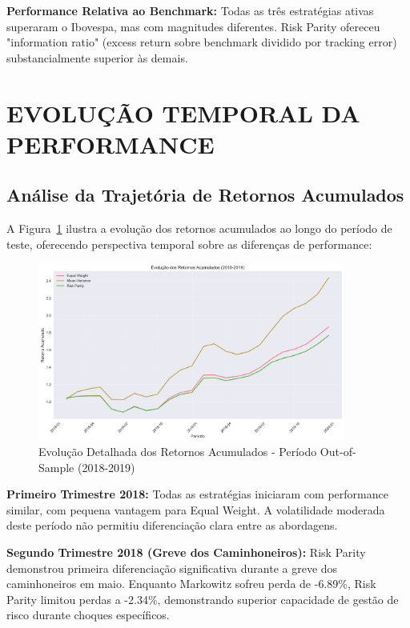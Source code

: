 \textbf{Performance Relativa ao Benchmark:} Todas as três estratégias ativas superaram o Ibovespa, mas com magnitudes diferentes. Risk Parity ofereceu "information ratio" (excess return sobre benchmark dividido por tracking error) substancialmente superior às demais.

\section{EVOLUÇÃO TEMPORAL DA PERFORMANCE}

\subsection{Análise da Trajetória de Retornos Acumulados}

A Figura~\ref{fig:retornos_acumulados_detalhado} ilustra a evolução dos retornos acumulados ao longo do período de teste, oferecendo perspectiva temporal sobre as diferenças de performance:

\begin{figure}[H]
\centering
\includegraphics[width=0.90\textwidth]{figures/retornos_acumulados.png}
\caption{Evolução Detalhada dos Retornos Acumulados - Período Out-of-Sample (2018-2019)}
\label{fig:retornos_acumulados_detalhado}
\end{figure}

\textbf{Primeiro Trimestre 2018:} Todas as estratégias iniciaram com performance similar, com pequena vantagem para Equal Weight. A volatilidade moderada deste período não permitiu diferenciação clara entre as abordagens.

\textbf{Segundo Trimestre 2018 (Greve dos Caminhoneiros):} Risk Parity demonstrou primeira diferenciação significativa durante a greve dos caminhoneiros em maio. Enquanto Markowitz sofreu perda de -6.89\%, Risk Parity limitou perdas a -2.34\%, demonstrando superior capacidade de gestão de risco durante choques específicos.

